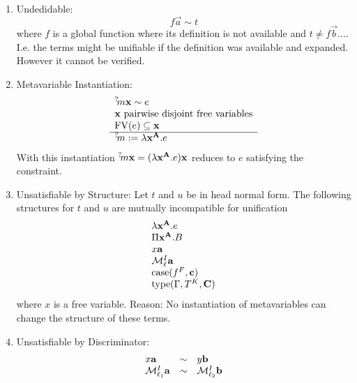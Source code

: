\begin{enumerate}
    \item Undedidable:
        $$
            f \vec a \sim t
        $$
        where $f$ is a global function where its definition is not available and
        $t \ne f \vec b \ldots$.
        I.e. the terms might be unifiable if the definition
        was available and expanded. However it cannot be verified.

    \item Metavariable Instantiation:
        $$
        \begin{array}{l} 
            {{}^? \kern-0.2em m} {\mathbf x} \sim e
            \\
            {\mathbf x} \text{ pairwise disjoint free variables}
            \\
            {\text{FV}}(e) \subseteq {\mathbf x}
         \\ \hline 
            {{}^? \kern-0.2em m} := \lambda {{\mathbf x}^{{\mathbf A}}}. e
         \end{array}
        $$
        With this instantiation ${{}^? \kern-0.2em m} {\mathbf x} = (\lambda {{\mathbf x}^{{\mathbf A}}} .e) {\mathbf x}$ reduces to $e$ satisfying the constraint.

    \item Unsatisfiable by Structure: Let $t$ and $u$ be in head normal form.
        The following structures for $t$ and $u$ are mutually incompatible for
        unification
        $$
        \begin{array}{l}
            \lambda {{\mathbf x}^{{\mathbf A}}}. e
            \\
            \Pi {{\mathbf x}^{{\mathbf A}}}. B
            \\
            x {\mathbf a}
            \\
            {\cal M}^I_\ell {\mathbf a}
            \\
            {\text{case}}(f^F , {\mathbf c})
            \\
            {\text{type}}(\Gamma , T^K , {\mathbf C})
        \end{array}
        $$
        where $x$ is a free variable. Reason: No instantiation of metavariables
        can change the structure of these terms.

    \item Unsatisfiable by Discriminator:
        $$
        \begin{array}{lll}
            x {\mathbf a} &\sim& y {\mathbf b}
            \\
            {\cal M}^I_{\ell_1} {\mathbf a} &\sim& {\cal M}^I_{\ell_2} {\mathbf b}
        \end{array}
        $$
\end{enumerate}








